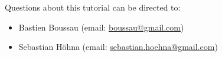 Questions about this tutorial can be directed to: \\\vspace{-10mm}
\begin{itemize}
\item Bastien Boussau (email: \href{mailto:boussau@gmail.com}{boussau@gmail.com}) \\\vspace{-8mm}
\item Sebastian H\"{o}hna (email: \href{mailto:sebastian.hoehna@gmail.com}{sebastian.hoehna@gmail.com})
\end{itemize}





